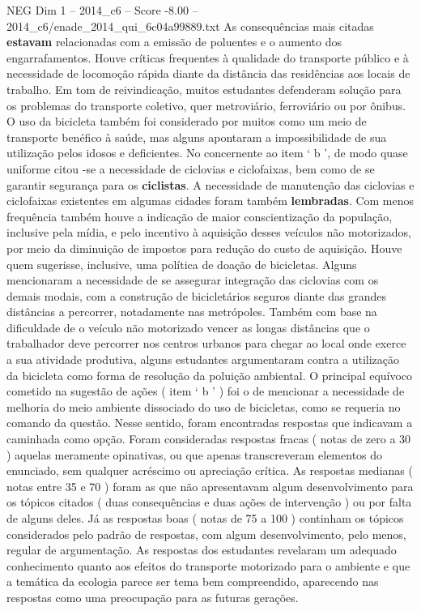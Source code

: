 \begin{textsample}{NEG Dim 1 – 2014\_c6 – Score -8.00 – 2014\_c6/enade\_2014\_qui\_6c04a99889.txt}
As consequências mais citadas \textbf{estavam} relacionadas com a emissão de poluentes e o aumento dos engarrafamentos.
Houve críticas frequentes à qualidade do transporte público e à necessidade de locomoção rápida diante da distância das residências aos locais de trabalho.
Em tom de reivindicação, muitos estudantes defenderam solução para os problemas do transporte coletivo, quer metroviário, ferroviário ou por ônibus.
O uso da bicicleta também foi considerado por muitos como um meio de transporte benéfico à saúde, mas alguns apontaram a impossibilidade de sua utilização pelos idosos e deficientes.
No concernente ao item ‘ b ’, de modo quase uniforme citou -se a necessidade de ciclovias e ciclofaixas, bem como de se garantir segurança para os \textbf{ciclistas}.
A necessidade de manutenção das ciclovias e ciclofaixas existentes em algumas cidades foram também \textbf{lembradas}.
Com menos frequência também houve a indicação de maior conscientização da população, inclusive pela mídia, e pelo incentivo à aquisição desses veículos não motorizados, por meio da diminuição de impostos para redução do custo de aquisição.
Houve quem sugerisse, inclusive, uma política de doação de bicicletas.
Alguns mencionaram a necessidade de se assegurar integração das ciclovias com os demais modais, com a construção de bicicletários seguros diante das grandes distâncias a percorrer, notadamente nas metrópoles.
Também com base na dificuldade de o veículo não motorizado vencer as longas distâncias que o trabalhador deve percorrer nos centros urbanos para chegar ao local onde exerce a sua atividade produtiva, alguns estudantes argumentaram contra a utilização da bicicleta como forma de resolução da poluição ambiental.
O principal equívoco cometido na sugestão de ações ( item ‘ b ’ ) foi o de mencionar a necessidade de melhoria do meio ambiente dissociado do uso de bicicletas, como se requeria no comando da questão.
Nesse sentido, foram encontradas respostas que indicavam a caminhada como opção.
Foram consideradas respostas fracas ( notas de zero a 30 ) aquelas meramente opinativas, ou que apenas transcreveram elementos do enunciado, sem qualquer acréscimo ou apreciação crítica.
As respostas medianas ( notas entre 35 e 70 ) foram as que não apresentavam algum desenvolvimento para os tópicos citados ( duas consequências e duas ações de intervenção ) ou por falta de alguns deles.
Já as respostas boas ( notas de 75 a 100 ) continham os tópicos considerados pelo padrão de respostas, com algum desenvolvimento, pelo menos, regular de argumentação.
As respostas dos estudantes revelaram um adequado conhecimento quanto aos efeitos do transporte motorizado para o ambiente e que a temática da ecologia parece ser tema bem compreendido, aparecendo nas respostas como uma preocupação para as futuras gerações.

\end{textsample}
